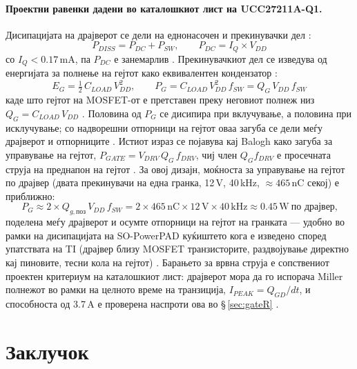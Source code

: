 \documentclass[11pt,a4paper]{article}
\newcommand{\eng}[1]{\textenglish{#1}}
\begin{document}
\paragraph{Проектни равенки дадени во каталошкиот лист на UCC27211A-Q1.} Дисипацијата на драјверот се дели на еднонасочен и прекинувачки дел \cite{ref3}:
\begin{equation}
P_{DISS} = P_{DC} + P_{SW}, \qquad P_{DC} = I_Q \times V_{DD}
\end{equation}
со $I_Q < 0.17$\,mA, па $P_{DC}$ е занемарлив \cite{ref3}. Прекинувачкиот дел се изведува од енергијата за полнење на гејтот како еквивалентен кондензатор \cite{ref3}:
\begin{equation}
E_G = \tfrac{1}{2}\,C_{LOAD}\,V_{DD}^{2}, \qquad P_G = C_{LOAD}\,V_{DD}^{2}\,f_{SW} = Q_G\,V_{DD}\,f_{SW}
\end{equation}
каде што гејтот на MOSFET-от е претставен преку неговиот полнеж низ $Q_G = C_{LOAD}\,V_{DD}$ \cite{ref3}. Половина од $P_G$ се дисипира при вклучување, а половина при исклучување; со надворешни отпорници на гејтот оваа загуба се дели меѓу драјверот и отпорниците \cite{ref3}. Истиот израз се појавува кај Balogh како загуба за управување на гејтот, $P_{GATE}=V_{DRV}\,Q_G\,f_{DRV}$, чиј член $Q_G f_{DRV}$ е просечната струја на преднапон на гејтот \cite{ref5}. За овој дизајн, моќноста за управување на гејтот по драјвер (двата прекинувачи на една гранка, 12\,V, 40\,kHz, $\approx 465$\,nC секој) е приближно:
\begin{equation}
P_G \approx 2 \times Q_{g,\text{поз}}\,V_{DD}\,f_{SW} = 2 \times 465\,\mathrm{nC} \times 12\,\mathrm{V} \times 40\,\mathrm{kHz} \approx 0.45\,\mathrm{W}\ \text{по драјвер,}
\end{equation}
поделена меѓу драјверот и осумте отпорници на гејтот на гранката --- удобно во рамки на дисипацијата на SO-PowerPAD куќиштето кога е изведено според упатствата на TI (драјвер близу MOSFET транзисторите, раздвојување директно кај пиновите, тесни кола на гејтот) \cite{ref3}. Барањето за врвна струја е сопствениот проектен критериум на каталошкиот лист: драјверот мора да го испорача \eng{Miller} полнежот во рамки на целното време на транзиција, $I_{PEAK} = Q_{GD}/dt$, и способноста од 3.7\,A е проверена наспроти ова во \S\,\ref{sec:gateR} \cite{ref3}.

\section{Заклучок}
\label{sec:concl}
\end{document}

